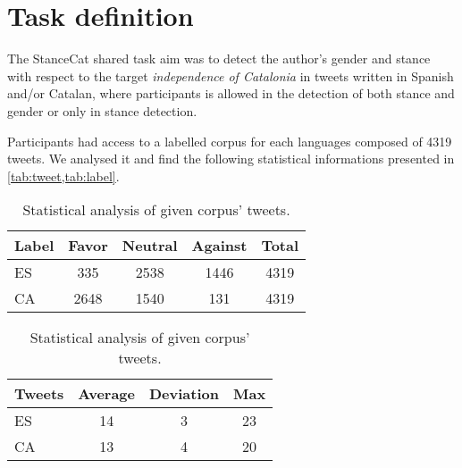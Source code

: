 \section{Task definition} \label{sec:task}

The StanceCat shared task aim was to detect the author's gender and stance with respect to the target \emph{independence of Catalonia} in tweets written in Spanish and/or Catalan, where participants is allowed in the detection of both stance and gender or only in stance detection.

Participants had access to a labelled corpus for each languages composed of 4319 tweets. We analysed it and find the following statistical informations presented in \cref{tab:tweet,tab:label}.

\begin{table}[h]
\footnotesize
\centering
\begin{tabular}{lcccc}
\hline
Label		& Favor		& Neutral		& Against	& Total		\\
\hline
ES			& 335		& 2538			& 1446		& 4319		\\
CA			& 2648		& 1540			& 131		& 4319		\\
\hline
\end{tabular}
\caption{Statistical analysis of given corpus' tweets.}
\label{tab:label}
\end{table}

\begin{table}[h]
\footnotesize
\centering
\begin{tabular}{lccc}
\hline
Tweets		& Average		& Deviation		& Max		\\
\hline
ES			& 14			& 3				& 23		\\ 
CA			& 13			& 4				& 20		\\ 
\hline
\end{tabular}
\caption{Statistical analysis of given corpus' tweets.}
\label{tab:tweet}
\end{table}


